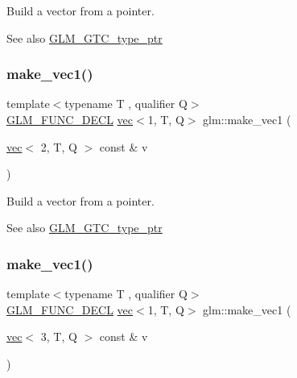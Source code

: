 Build a vector from a pointer. \begin{DoxySeeAlso}{See also}
\hyperlink{group__gtc__type__ptr}{G\+L\+M\+\_\+\+G\+T\+C\+\_\+type\+\_\+ptr} 
\end{DoxySeeAlso}
\mbox{\label{group__gtc__type__ptr_ga13c92b81e55f201b052a6404d57da220}} 
\subsubsection{\texorpdfstring{make\+\_\+vec1()}{make\_vec1()}\hspace{0.1cm}{\footnotesize\ttfamily [2/4]}}
{\footnotesize\ttfamily template$<$typename T , qualifier Q$>$ \\
\hyperlink{setup_8hpp_ab2d052de21a70539923e9bcbf6e83a51}{G\+L\+M\+\_\+\+F\+U\+N\+C\+\_\+\+D\+E\+CL} \hyperlink{structglm_1_1vec}{vec}$<$1, T, Q$>$ glm\+::make\+\_\+vec1 (\begin{DoxyParamCaption}\item[{\hyperlink{structglm_1_1vec}{vec}$<$ 2, T, Q $>$ const \&}]{v }\end{DoxyParamCaption})\hspace{0.3cm}{\ttfamily [inline]}}

Build a vector from a pointer. \begin{DoxySeeAlso}{See also}
\hyperlink{group__gtc__type__ptr}{G\+L\+M\+\_\+\+G\+T\+C\+\_\+type\+\_\+ptr} 
\end{DoxySeeAlso}
\mbox{\label{group__gtc__type__ptr_ga3c23cc74086d361e22bbd5e91a334e03}} 
\subsubsection{\texorpdfstring{make\+\_\+vec1()}{make\_vec1()}\hspace{0.1cm}{\footnotesize\ttfamily [3/4]}}
{\footnotesize\ttfamily template$<$typename T , qualifier Q$>$ \\
\hyperlink{setup_8hpp_ab2d052de21a70539923e9bcbf6e83a51}{G\+L\+M\+\_\+\+F\+U\+N\+C\+\_\+\+D\+E\+CL} \hyperlink{structglm_1_1vec}{vec}$<$1, T, Q$>$ glm\+::make\+\_\+vec1 (\begin{DoxyParamCaption}\item[{\hyperlink{structglm_1_1vec}{vec}$<$ 3, T, Q $>$ const \&}]{v }\end{DoxyParamCaption})\hspace{0.3cm}{\ttfamily [inline]}}

